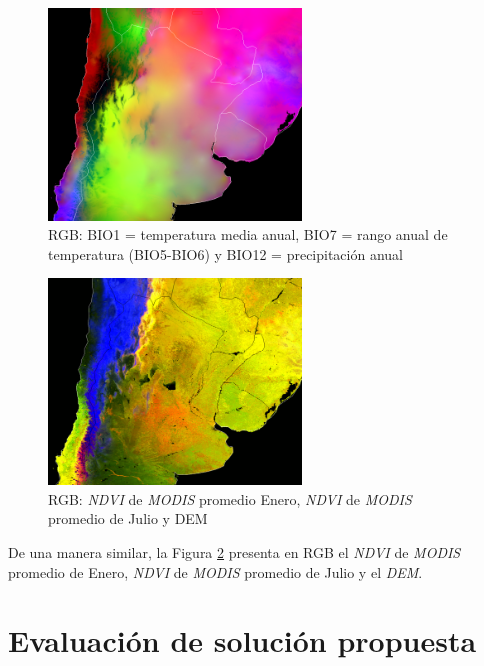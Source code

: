     \begin{figure}[hbt]
      \centering%
      \includegraphics[width=0.6\textwidth]{images/temp_prec}%
      \caption{RGB: BIO1 = temperatura media anual, BIO7 = rango anual de
              temperatura (BIO5-BIO6) y BIO12 = precipitación anual}\label{fig:temp_prec}
    \end{figure}

    \begin{figure}[hbt]
      \centering%
      \includegraphics[width=0.6\textwidth]{images/ndvi_dem}%
      \caption{RGB: \textit{NDVI} de \textit{MODIS} promedio Enero, \textit{NDVI} de
               \textit{MODIS} promedio de Julio y DEM}\label{fig:ndvi_dem}
    \end{figure}

    \par De una manera similar, la Figura \ref{fig:ndvi_dem} presenta en RGB el
      \textit{NDVI} de \textit{MODIS} promedio de Enero, \textit{NDVI} de
      \textit{MODIS} promedio de Julio y el \textit{DEM}.

\section{Evaluación de solución propuesta}

